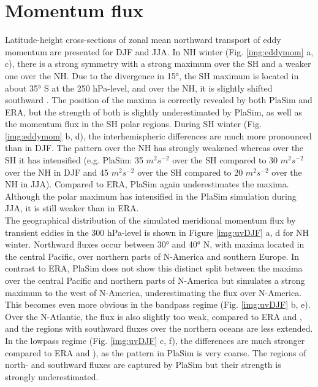 \documentclass[12pt,a4paper,twoside,openright,headinclude,liststotoc,bibtotoc]{scrreprt}
\begin{document}
\vspace{-0.4cm}
\section{Momentum flux}
\vspace{-0.4cm}

Latitude-height cross-sections of zonal mean northward transport of eddy momentum are presented for DJF and JJA. In NH winter (Fig. \ref{img:eddymom} a, c), there is a strong symmetry with a strong maximum over the SH and a weaker one over the NH. Due to the divergence in 15°, the SH maximum is located in about 35° S at the 250 hPa-level, and over the NH, it is slightly shifted southward \citep[p. 256]{Peixoto1993}. The position of the maxima is correctly revealed by both PlaSim and ERA, but the strength of both is slightly underestimated by PlaSim, as well as the momentum flux in the SH polar regions. During SH winter (Fig. \ref{img:eddymom} b, d), the interhemispheric differences are much more pronounced than in DJF. The pattern over the NH has strongly weakened whereas over the SH it has intensified (e.g. PlaSim: 35 $m^{2}s^{-2}$ over the SH compared to 30 $m^{2}s^{-2}$ over the NH in DJF and 45 $m^{2}s^{-2}$ over the SH compared to 20 $m^{2}s^{-2}$ over the NH in JJA). Compared to ERA, PlaSim again underestimates the maxima. Although the polar maximum has intensified in the PlaSim simulation during JJA, it is still weaker than in ERA.\\
The geographical distribution of the simulated meridional momentum flux by transient eddies in the 300 hPa-level is shown in Figure \ref{img:uvDJF} a, d for NH winter. Northward fluxes occur between 30° and 40° N, with maxima located in the central Pacific, over northern parts of N-America and southern Europe. In contrast to ERA, PlaSim does not show this distinct split between the maxima over the central Pacific and northern parts of N-America but simulates a strong maximum to the west of N-America, underestimating the flux over N-America. This becomes even more obvious in the bandpass regime (Fig. \ref{img:uvDJF} b, e). Over the N-Atlantic, the flux is also slightly too weak, compared to ERA and \citet[p. 88]{Roeckner1996}, and the regions with southward fluxes over the northern oceans are less extended. In the lowpass regime (Fig. \ref{img:uvDJF} c, f), the differences are much stronger compared to ERA and \citet[p. 88]{Roeckner1996}), as the pattern in PlaSim is very coarse. The regions of north- and southward fluxes are captured by PlaSim but their strength is strongly underestimated. 
\end{document}
